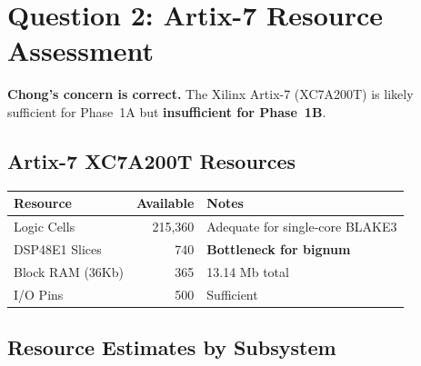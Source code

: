 \documentclass[11pt,a4paper]{article}
\begin{document}
\section{Question 2: Artix-7 Resource Assessment}

\textbf{Chong's concern is correct.} The Xilinx Artix-7 (XC7A200T) is likely sufficient for Phase~1A but \textbf{insufficient for Phase~1B}.

\subsection{Artix-7 XC7A200T Resources}

\begin{center}
\begin{tabular}{@{}lrl@{}}
\toprule
\textbf{Resource} & \textbf{Available} & \textbf{Notes} \\
\midrule
Logic Cells & 215,360 & Adequate for single-core BLAKE3 \\
DSP48E1 Slices & 740 & \textcolor{dbred}{\textbf{Bottleneck for bignum}} \\
Block RAM (36Kb) & 365 & 13.14 Mb total \\
I/O Pins & 500 & Sufficient \\
\bottomrule
\end{tabular}
\end{center}

\subsection{Resource Estimates by Subsystem}
\end{document}

